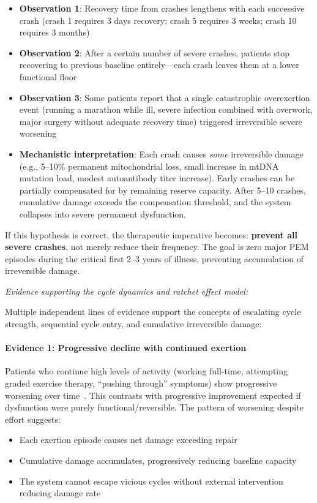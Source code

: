 \begin{itemize}
    \item \textbf{Observation 1}: Recovery time from crashes lengthens with each successive crash (crash 1 requires 3 days recovery; crash 5 requires 3 weeks; crash 10 requires 3 months)

    \item \textbf{Observation 2}: After a certain number of severe crashes, patients stop recovering to previous baseline entirely---each crash leaves them at a lower functional floor

    \item \textbf{Observation 3}: Some patients report that a single catastrophic overexertion event (running a marathon while ill, severe infection combined with overwork, major surgery without adequate recovery time) triggered irreversible severe worsening

    \item \textbf{Mechanistic interpretation}: Each crash causes \textit{some} irreversible damage (e.g., 5--10\% permanent mitochondrial loss, small increase in mtDNA mutation load, modest autoantibody titer increase). Early crashes can be partially compensated for by remaining reserve capacity. After 5--10 crashes, cumulative damage exceeds the compensation threshold, and the system collapses into severe permanent dysfunction.
\end{itemize}

If this hypothesis is correct, the therapeutic imperative becomes: \textbf{prevent all severe crashes}, not merely reduce their frequency. The goal is zero major PEM episodes during the critical first 2--3 years of illness, preventing accumulation of irreversible damage.

\textit{Evidence supporting the cycle dynamics and ratchet effect model:}

Multiple independent lines of evidence support the concepts of escalating cycle strength, sequential cycle entry, and cumulative irreversible damage:

\paragraph{Evidence 1: Progressive decline with continued exertion}

Patients who continue high levels of activity (working full-time, attempting graded exercise therapy, ``pushing through'' symptoms) show progressive worsening over time~\cite{Chu2019}. This contrasts with progressive improvement expected if dysfunction were purely functional/reversible. The pattern of worsening despite effort suggests:
\begin{itemize}
    \item Each exertion episode causes net damage exceeding repair
    \item Cumulative damage accumulates, progressively reducing baseline capacity
    \item The system cannot escape vicious cycles without external intervention reducing damage rate
\end{itemize}


